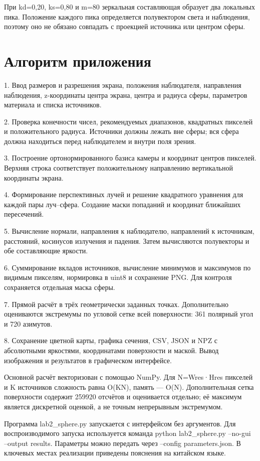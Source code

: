 \documentclass[a4paper,12pt]{article}
\begin{document}
При kd=0,20, ks=0,80 и m=80 зеркальная составляющая образует два локальных пика. Положение каждого пика определяется полувектором света и наблюдения, поэтому оно не обязано совпадать с проекцией источника или центром сферы.

\clearpage
\section{Алгоритм приложения}
1. Ввод размеров и разрешения экрана, положения наблюдателя, направления наблюдения, z-координаты центра экрана, центра и радиуса сферы, параметров материала и списка источников.

2. Проверка конечности чисел, рекомендуемых диапазонов, квадратных пикселей и положительного радиуса. Источники должны лежать вне сферы; вся сфера должна находиться перед наблюдателем и внутри поля зрения.

3. Построение ортонормированного базиса камеры и координат центров пикселей. Верхняя строка соответствует положительному направлению вертикальной координаты экрана.

4. Формирование перспективных лучей и решение квадратного уравнения для каждой пары луч–сфера. Создание маски попаданий и координат ближайших пересечений.

5. Вычисление нормали, направления к наблюдателю, направлений к источникам, расстояний, косинусов излучения и падения. Затем вычисляются полувекторы и обе составляющие яркости.

6. Суммирование вкладов источников, вычисление минимумов и максимумов по видимым пикселям, нормировка в uint8 и сохранение PNG. Для контроля сохраняется отдельная маска сферы.

7. Прямой расчёт в трёх геометрически заданных точках. Дополнительно оцениваются экстремумы по угловой сетке всей поверхности: 361 полярный угол и 720 азимутов.

8. Сохранение цветной карты, графика сечения, CSV, JSON и NPZ с абсолютными яркостями, координатами поверхности и маской. Вывод изображения и результатов в графическом интерфейсе.

Основной расчёт векторизован с помощью NumPy. Для N=Wres·Hres пикселей и K источников сложность равна O(KN), память — O(N). Дополнительная сетка поверхности содержит 259920 отсчётов и оценивается отдельно; её максимум является дискретной оценкой, а не точным непрерывным экстремумом.

Программа lab2\_sphere.py запускается с интерфейсом без аргументов. Для воспроизводимого запуска используется команда python lab2\_sphere.py --no-gui --output results. Параметры можно передать через --config parameters.json. В ключевых местах реализации приведены пояснения на китайском языке.
\end{document}
